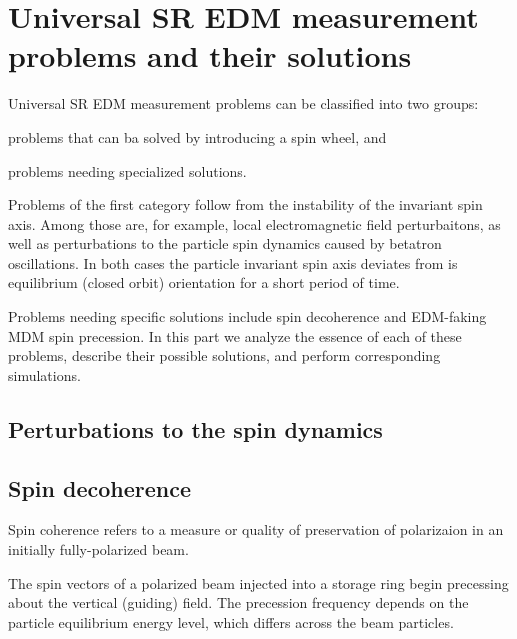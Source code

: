 

\chapter{Universal SR EDM measurement problems and their solutions} \label{chpt3:top-level}
 
Universal SR EDM measurement problems can be classified into two groups:
\begin{enumerate*}[(i)]
	\item problems that can ba solved by introducing a spin wheel, and
	\item problems needing specialized solutions.
\end{enumerate*}

Problems of the first category follow from the instability of the invariant spin axis. Among those are,
for example, local electromagnetic field perturbaitons, as well as perturbations to the particle
spin dynamics caused by betatron oscillations. In both cases the particle invariant spin axis deviates from
is equilibrium (closed orbit) orientation for a short period of time.

Problems needing specific solutions include spin decoherence and EDM-faking MDM spin precession. In this part we
analyze the essence of each of these problems, describe their possible solutions, and perform corresponding
simulations.
  
\section{Perturbations to the spin dynamics}\label{chpt3:smp}


\section{Spin decoherence}\label{chpt3:decoherence}
Spin coherence refers to a measure or quality of preservation of polarizaion
in an initially fully-polarized beam.~\cite[p.~205]{Eremey:Thesis}

The spin vectors of a polarized beam injected into a storage ring
begin precessing about the vertical (guiding) field. The precession frequency
depends on the particle equilibrium energy level, which differs across the beam particles.

